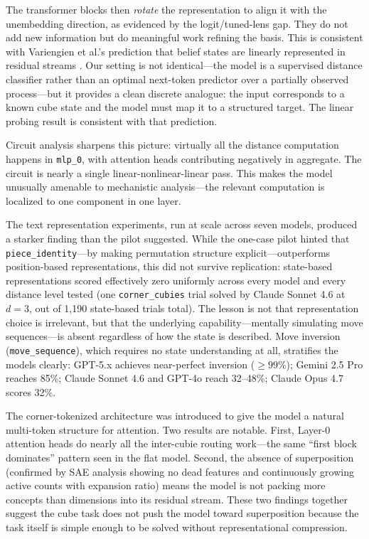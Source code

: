 \documentclass[12pt]{article}
\begin{document}
The transformer blocks then \emph{rotate} the representation to align it with the
unembedding direction, as evidenced by the logit/tuned-lens gap.  They do not add
new information but do meaningful work refining the basis.  This is consistent with
Variengien et al.'s prediction that belief states are linearly represented in
residual streams \cite{variengien2024beliefstate}.  Our setting is not
identical---the model is a supervised distance classifier rather than an optimal
next-token predictor over a partially observed process---but it provides a clean
discrete analogue: the input corresponds to a known cube state and the model
must map it to a structured target.  The linear probing result is consistent
with that prediction.

Circuit analysis sharpens this picture: virtually all the distance computation
happens in \texttt{mlp\_0}, with attention heads contributing negatively in
aggregate.  The circuit is nearly a single linear-nonlinear-linear pass.  This
makes the model unusually amenable to mechanistic analysis---the relevant
computation is localized to one component in one layer.

The text representation experiments, run at scale across seven models, produced
a starker finding than the pilot suggested.  While the one-case pilot hinted that
\texttt{piece\_identity}---by making permutation structure explicit---outperforms
position-based representations, this did not survive replication: state-based
representations scored effectively zero uniformly across every model and every distance level
tested (one \texttt{corner\_cubies} trial solved by Claude Sonnet 4.6 at $d{=}3$,
out of 1,190 state-based trials total).  The lesson is not that representation choice is irrelevant, but that the
underlying capability---mentally simulating move sequences---is absent regardless
of how the state is described.  Move inversion (\texttt{move\_sequence}), which
requires no state understanding at all, stratifies the models clearly: GPT-5.x
achieves near-perfect inversion (${\geq}99\%$); Gemini 2.5 Pro reaches 85\%;
Claude Sonnet 4.6 and GPT-4o reach 32--48\%; Claude Opus 4.7 scores 32\%.

The corner-tokenized architecture was introduced to give the model a natural
multi-token structure for attention.  Two results are notable.  First, Layer-0
attention heads do nearly all the inter-cubie routing work---the same ``first block
dominates'' pattern seen in the flat model.  Second, the absence of superposition
(confirmed by SAE analysis showing no dead features and continuously growing active
counts with expansion ratio) means the model is not packing more concepts than
dimensions into its residual stream.  These two findings together suggest the cube
task does not push the model toward superposition because the task itself is simple
enough to be solved without representational compression.
\end{document}
